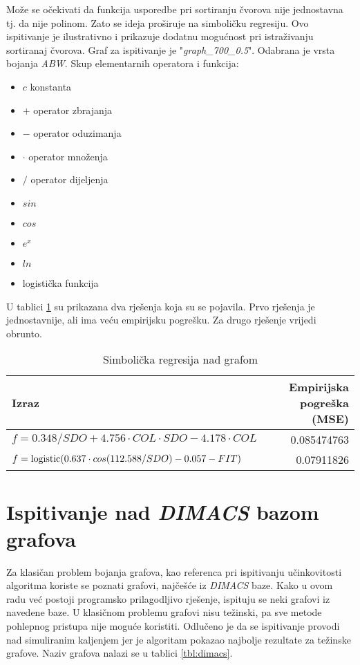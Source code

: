 \documentclass[times, utf8, diplomski, numeric]{fer}
\begin{document}
Može se očekivati da funkcija usporedbe pri sortiranju čvorova nije jednostavna tj. da nije polinom. Zato se ideja proširuje na simboličku regresiju. Ovo ispitivanje je ilustrativno i prikazuje dodatnu mogućnost pri istraživanju sortiranaj čvorova. Graf za ispitivanje je "\emph{graph\_700\_0.5}". Odabrana je vrsta bojanja \emph{ABW}. Skup elementarnih operatora i funkcija:

\begin{itemize}
	\item $c$  konstanta
	\item $+$ operator zbrajanja
	\item $-$ operator oduzimanja
	\item $\cdot $ operator množenja
	\item $/$ operator dijeljenja
	\item $sin$
	\item $cos$
	\item $e^x$
	\item $ln$ 
	\item logistička funkcija
\end{itemize} 

U tablici \ref{tbl:sym-reg} su prikazana dva rješenja koja su se pojavila. Prvo rješenja je jednostavnije, ali ima veću empirijsku pogrešku. Za drugo rješenje vrijedi obrunto.

\begin{table}[htb]
	\caption{Simbolička regresija nad grafom}
	\label{tbl:sym-reg}
	\centering
	\begin{tabular}{|l|r|} \hline
	Izraz & Empirijska pogreška (MSE)\\ \hline \hline
	$f = 0.348/SDO + 4.756\cdot COL \cdot SDO - 4.178\cdot COL$ & 0.085474763\\ \hline
	$f = \textup{logistic}(0.637\cdot cos(112.588/SDO) - 0.057 - FIT)$ & 0.07911826 \\ \hline
	\end{tabular}
\end{table}


\section{Ispitivanje nad \emph{DIMACS} bazom grafova}

Za klasičan problem bojanja grafova, kao referenca pri ispitivanju učinkovitosti algoritma koriste se poznati grafovi, najčešće iz \emph{DIMACS} baze. Kako u ovom radu već postoji programsko prilagodljivo rješenje, ispituju se neki grafovi iz navedene baze. U klasičnom problemu grafovi nisu težinski, pa sve metode pohlepnog pristupa nije moguće koristiti. Odlučeno je da se ispitivanje provodi nad simuliranim kaljenjem jer je algoritam pokazao najbolje rezultate za težinske grafove. Naziv grafova nalazi se u tablici \ref{tbl:dimacs}.
\end{document}
